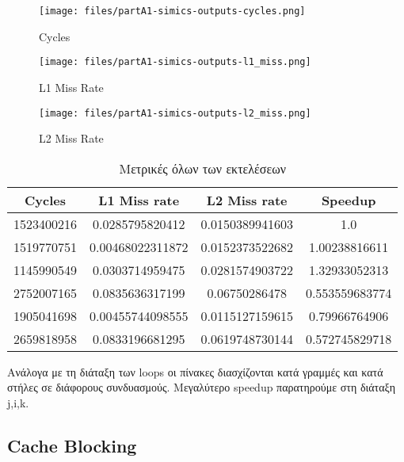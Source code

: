 \documentclass[a4paper,12pt]{article}
\begin{document}
\begin{figure}[H]
	\centering
    \texttt{[image: files/partA1-simics-outputs-cycles.png]}
	\caption{Cycles}
	\label{fig:A1}
\end{figure}

\begin{figure}[H]
	\centering
    \texttt{[image: files/partA1-simics-outputs-l1\_miss.png]}
    \caption{L1 Miss Rate}
	\label{fig:A2}
\end{figure}

\begin{figure}[H]
	\centering
    \texttt{[image: files/partA1-simics-outputs-l2\_miss.png]}
    \caption{L2 Miss Rate}
	\label{fig:A3}
\end{figure}

\begin{table}[H]
    \centering
    \begin{tabular}{| c | c | c | c |}
        \hline
        Cycles & L1 Miss rate & L2 Miss rate & Speedup  \\
        \hline
        \hline
        1523400216 & 0.0285795820412 & 0.0150389941603 & 1.0 \\
        1519770751 & 0.00468022311872 & 0.0152373522682 & 1.00238816611 \\
        1145990549 & 0.0303714959475 & 0.0281574903722 & 1.32933052313 \\
        2752007165 & 0.0835636317199 & 0.06750286478 & 0.553559683774 \\
        1905041698 & 0.00455744098555 & 0.0115127159615 & 0.79966764906 \\
        2659818958 & 0.0833196681295 & 0.0619748730144 & 0.572745829718 \\
        \hline
    \end{tabular}
    \caption{Μετρικές όλων των εκτελέσεων}
    \label{fig:T2}
\end{table}


Ανάλογα με τη διάταξη των loops οι πίνακες διασχίζονται κατά γραμμές και κατά
στήλες σε διάφορους συνδυασμούς. Μεγαλύτερο speedup παρατηρούμε στη διάταξη
j,i,k.


\pagebreak


\subsection{Cache Blocking}
\end{document}

